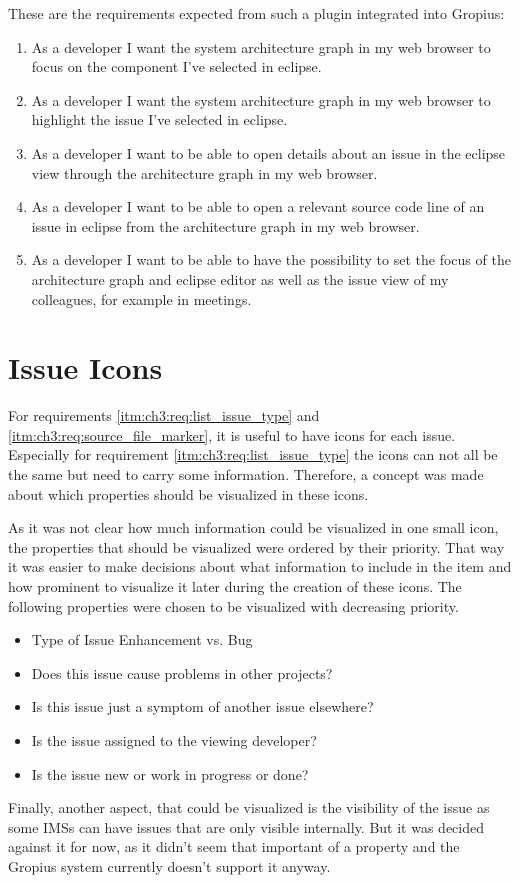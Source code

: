 These are the requirements expected from such a plugin integrated into Gropius:
\begin{enumerate}
	\setcounter{enumi}{\value{enumarteCounter}} %
	\item As a developer I want the system architecture graph in my web browser to focus on the component I've selected in eclipse.
	\item As a developer I want the system architecture graph in my web browser to highlight the issue I've selected in eclipse.
	\item As a developer I want to be able to open details about an issue in the eclipse view through the architecture graph in my web browser.
	\item As a developer I want to be able to open a relevant source code line of an issue in eclipse from the architecture graph in my web browser.
	\item As a developer I want to be able to have the possibility to set the focus of the architecture graph and eclipse editor as well as the issue view of my colleagues, for example in meetings.
\end{enumerate}

\section{Issue Icons}
\label{sec:ch3:s2}
For requirements \ref{itm:ch3:req:list_issue_type} and \ref{itm:ch3:req:source_file_marker}, it is useful to have icons for each issue.
Especially for requirement \ref{itm:ch3:req:list_issue_type} the icons can not all be the same but need to carry some information.
Therefore, a concept was made about which properties should be visualized in these icons.

As it was not clear how much information could be visualized in one small icon, 
the properties that should be visualized were ordered by their priority.
That way it was easier to make decisions about what information to include in the item and how prominent to visualize it later during the creation of these icons.
The following properties were chosen to be visualized with decreasing priority.
\begin{itemize}
	\item Type of Issue
	\subitem Enhancement vs. Bug
	\item Does this issue cause problems in other projects?
	\item Is this issue just a symptom of another issue elsewhere?
	\item Is the issue assigned to the viewing developer?
	\item Is the issue new or work in progress or done?
\end{itemize}
Finally, another aspect, that could be visualized is the visibility of the issue as some \glspl{IMS} can have issues that are only visible internally.
But it was decided against it for now, as it didn't seem that important of a property and the Gropius system currently doesn't support it anyway.


